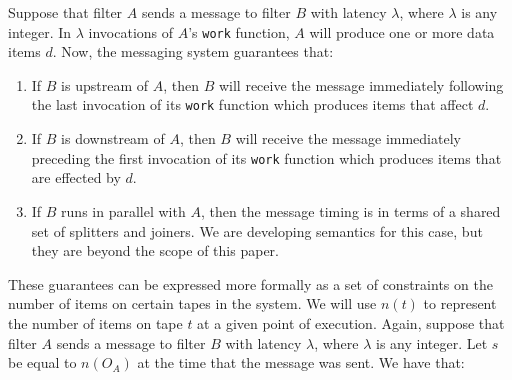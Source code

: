 Suppose that filter $A$ sends a message to filter $B$ with latency
$\lambda$, where $\lambda$ is any integer.  In $\lambda$ invocations
of $A$'s {\tt work} function, $A$ will produce one or more data items
$d$.  Now, the messaging system guarantees that:
\begin{enumerate}
\item If $B$ is upstream of $A$, then $B$ will receive the message
immediately following the last invocation of its {\tt work} function
which produces items that affect $d$.

\item If $B$ is downstream of $A$, then $B$ will receive the message
immediately preceding the first invocation of its {\tt work} function
which produces items that are effected by $d$.

\item If $B$ runs in parallel with $A$, then the message timing is in terms
of a shared set of splitters and joiners.  We are developing semantics
for this case, but they are beyond the scope of this paper.
\end{enumerate}
These guarantees can be expressed more formally as a set of
constraints on the number of items on certain tapes in the system.  We
will use $n(t)$ to represent the number of items on tape $t$ at a
given point of execution.  Again, suppose that filter $A$ sends a
message to filter $B$ with latency $\lambda$, where $\lambda$ is any
integer.  Let $s$ be equal to $n(O_A)$ at the time that the message
was sent.  We have that:

